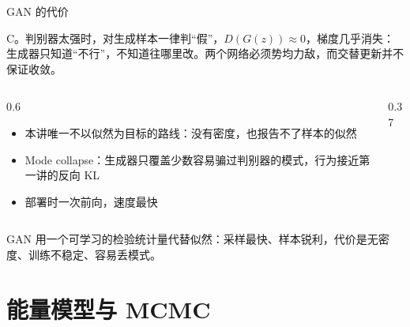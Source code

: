 \documentclass[aspectratio=169,10pt,UTF8,fontset=none]{ctexbeamer}
\begin{document}
\begin{frame}{GAN 的代价}
  \begin{answer}
    C。判别器太强时，对生成样本一律判“假”，$D(G(z))\approx0$，梯度几乎消失：生成器只知道“不行”，不知道往哪里改。两个网络必须势均力敌，而交替更新并不保证收敛。
  \end{answer}
  \begin{columns}[T]
    \begin{column}{0.6\textwidth}
      \begin{itemize}
        \item 本讲唯一不以似然为目标的路线：没有密度，也报告不了样本的似然
        \item Mode collapse：生成器只覆盖少数容易骗过判别器的模式，行为接近第一讲的反向 KL
        \item 部署时一次前向，速度最快
      \end{itemize}
    \end{column}
    \begin{column}{0.37\textwidth}
      \centering
    \end{column}
  \end{columns}
  \vspace{1.5mm}
  {\small{}}
  \vfill
  \begin{takeaway}[小结]
    GAN 用一个可学习的检验统计量代替似然：采样最快、样本锐利，代价是无密度、训练不稳定、容易丢模式。
  \end{takeaway}
\end{frame}

\section{能量模型与 MCMC}
\end{document}
